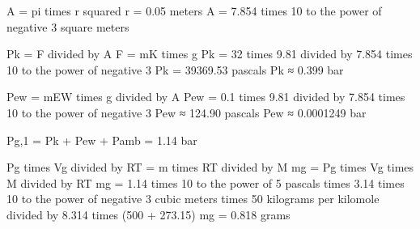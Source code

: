 A = pi times r squared  
r = 0.05 meters  
A = 7.854 times 10 to the power of negative 3 square meters  

Pk = F divided by A  
F = mK times g  
Pk = 32 times 9.81 divided by 7.854 times 10 to the power of negative 3  
Pk = 39369.53 pascals  
Pk ≈ 0.399 bar  

Pew = mEW times g divided by A  
Pew = 0.1 times 9.81 divided by 7.854 times 10 to the power of negative 3  
Pew ≈ 124.90 pascals  
Pew ≈ 0.0001249 bar  

Pg,1 = Pk + Pew + Pamb = 1.14 bar  

Pg times Vg divided by RT = m times RT divided by M  
mg = Pg times Vg times M divided by RT  
mg = 1.14 times 10 to the power of 5 pascals times 3.14 times 10 to the power of negative 3 cubic meters times 50 kilograms per kilomole divided by 8.314 times (500 + 273.15)  
mg = 0.818 grams